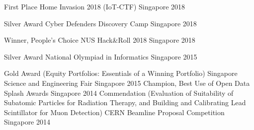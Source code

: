 


\begin{cvhonors}

  \cvhonor
    {First Place} %
    {Home Invasion 2018 (IoT-CTF)} %
    {Singapore} %
    {2018} %

  \cvhonor
    {Silver Award} %
    {Cyber Defenders Discovery Camp} %
    {Singapore} %
    {2018} %

  \cvhonor
    {Winner, People's Choice} %
    {NUS Hack\&Roll 2018} %
    {Singapore} %
    {2018} %

  \cvhonor
    {Silver Award} %
    {National Olympiad in Informatics} %
    {Singapore} %
    {2015} %

  \cvhonor
    {Gold Award (Equity Portfolios: Essentials of a Winning Portfolio)} %
    {Singapore Science and Engineering Fair} %
    {Singapore} %
    {2015} %
  \cvhonor
    {Champion, Best Use of Open Data} %
    {Splash Awards} %
    {Singapore} %
    {2014} %
  \cvhonor
    {Commendation (Evaluation of Suitability of Subatomic Particles for Radiation Therapy, and Building and Calibrating Lead Scintillator for Muon Detection)} %
    {CERN Beamline Proposal Competition} %
    {Singapore} %
    {2014} %
\end{cvhonors}
